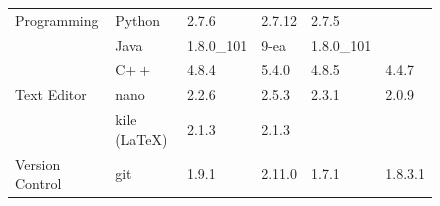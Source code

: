 \begin{figure}[!htp]
\begin{table}[!ht]
{\begin{tabular}{|ll|l|l|l|l|}
\hline
\rowcolor{black!10}
\cellcolor{white} Programming                                          & \multicolumn{1}{|l|}{Python}                 & 2.7.6                                                               & 2.7.12                                                            & 2.7.5                                                                  &                                                \\
\rowcolor{black!5}
\cellcolor{white}                                                      & \multicolumn{1}{|l|}{Java}                   & 1.8.0\_101                                                          & 9-ea                                                              & 1.8.0\_101                                                             &                                                \\
\rowcolor{black!10}
\cellcolor{white}                                                      & \multicolumn{1}{|l|}{C$++$}                  & 4.8.4                                                               & 5.4.0                                                             & 4.8.5                                                                  & 4.4.7                                          \\
\hline
\rowcolor{black!5}
\cellcolor{white} Text Editor                                          & \multicolumn{1}{|l|}{nano}                   & 2.2.6                                                               & 2.5.3                                                             & 2.3.1                                                                  & 2.0.9                                          \\
\rowcolor{black!10}
\cellcolor{white}                                                      & \multicolumn{1}{|l|}{kile (\LaTeX)}          & 2.1.3                                                               & 2.1.3                                                             &                                                                        &                                                \\
\hline
\rowcolor{black!5}
\cellcolor{white} Version Control                                      & \multicolumn{1}{|l|}{git}                    & 1.9.1                                                               & 2.11.0                                                            & 1.7.1                                                                  & 1.8.3.1                                        \\

\end{tabular}}
\end{table}
\end{figure}
